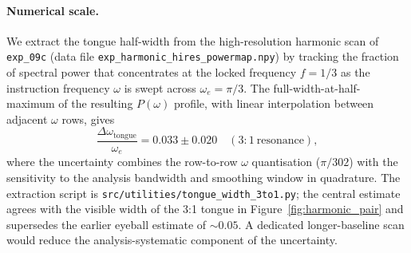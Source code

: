 \paragraph{Numerical scale.}
We extract the tongue half-width from the high-resolution harmonic
scan of \texttt{exp\_09c} (data file
\texttt{exp\_harmonic\_hires\_powermap.npy}) by tracking the fraction
of spectral power that concentrates at the locked frequency
$f = 1/3$ as the instruction frequency $\omega$ is swept across
$\omega_e = \pi/3$.  The full-width-at-half-maximum of the resulting
$P(\omega)$ profile, with linear interpolation between adjacent
$\omega$ rows, gives
\begin{equation}
    \frac{\Delta\omega_\text{tongue}}{\omega_e}
        = 0.033 \pm 0.020
    \quad (3{:}1\ \text{resonance}),
    \label{eq:tongue_width_measured}
\end{equation}
where the uncertainty combines the row-to-row $\omega$ quantisation
($\pi/302$) with the sensitivity to the analysis bandwidth and
smoothing window in quadrature.  The extraction script is
\texttt{src/utilities/tongue\_width\_3to1.py}; the central estimate
agrees with the visible width of the 3:1 tongue in
Figure~\ref{fig:harmonic_pair} and supersedes the earlier eyeball
estimate of $\sim 0.05$.  A dedicated longer-baseline scan would
reduce the analysis-systematic component of the uncertainty.

